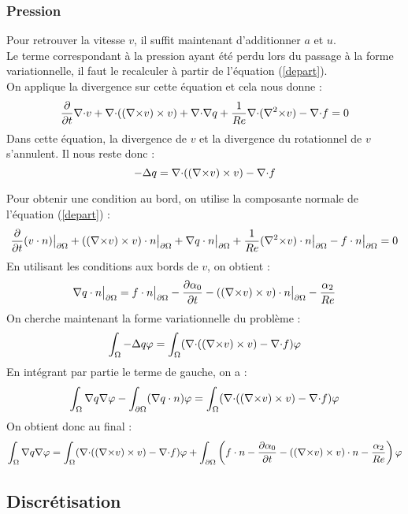 \subsubsection{Pression}
\label{pression}

Pour retrouver la vitesse $v$, il suffit maintenant d'additionner $a$ et $u$.\\
Le terme correspondant à la pression ayant été perdu lors du passage à la forme variationnelle, il faut le recalculer à partir de l'équation (\ref{depart}).\\

On applique la divergence sur cette équation et cela nous donne :
\[
\frac{\partial}{\partial t}{\nabla\cdot} v + {\nabla\cdot}(({\nabla\times} v)\times v) + {\nabla\cdot}{\nabla} q + \frac{1}{Re}{\nabla\cdot}({\nabla^2\times} v) - {\nabla\cdot} f = 0
\]
Dans cette équation, la divergence de $v$ et la divergence du rotationnel de $v$ s'annulent. Il nous reste donc :
\[
-{\Delta} q = {\nabla\cdot}(({\nabla\times} v)\times v) - {\nabla\cdot} f
\]

Pour obtenir une condition au bord, on utilise la composante normale de l'équation (\ref{depart}) :
\[
\frac{\partial}{\partial t}(v\cdot n){\big\rvert_{\partial\Omega}} + (({\nabla\times} v)\times v)\cdot n{\big\rvert_{\partial\Omega}} + {\nabla} q\cdot n{\big\rvert_{\partial\Omega}} +\frac{1}{Re}({\nabla^2\times} v)\cdot n{\big\rvert_{\partial\Omega}} - f\cdot n{\big\rvert_{\partial\Omega}} = 0
\]
En utilisant les conditions aux bords de $v$, on obtient :
\[
{\nabla} q\cdot n{\big\rvert_{\partial\Omega}} =  f\cdot n{\big\rvert_{\partial\Omega}} - \frac{\partial\alpha_0}{\partial t} - (({\nabla\times} v)\times v)\cdot n{\big\rvert_{\partial\Omega}} - \frac{\alpha_2}{Re}
\]
On cherche maintenant la forme variationnelle du problème :
\[
\int_\Omega -{\Delta} q\varphi = \int_\Omega ({\nabla\cdot}(({\nabla\times} v)\times v) -{\nabla\cdot} f)\varphi
\] 
En intégrant par partie le terme de gauche, on a :
\[
\int_\Omega {\nabla} q{\nabla}\varphi - \int_{\partial\Omega} ({\nabla} q\cdot n)\varphi = \int_\Omega ({\nabla\cdot}(({\nabla\times} v)\times v) -{\nabla\cdot} f)\varphi
\]
On obtient donc au final :
\begin{eqnarray}
\label{fvsol}
\int_\Omega {\nabla} q{\nabla}\varphi = \int_\Omega ({\nabla\cdot}(({\nabla\times} v)\times v) -{\nabla\cdot} f)\varphi + \int_{\partial\Omega} \left(f\cdot n - \frac{\partial\alpha_0}{\partial t} - (({\nabla\times} v)\times v)\cdot n - \frac{\alpha_2}{Re}\right)\varphi
\end{eqnarray}

\subsection{Discrétisation}

